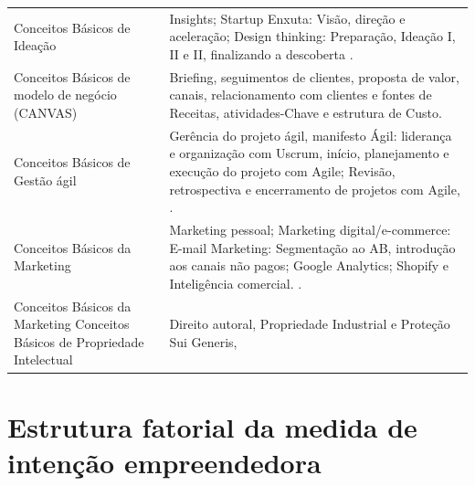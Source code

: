 \begin{apendicesenv}
\begin{longtable}{p{3.5cm}p{11.0cm}}
\endlastfoot

Conceitos Básicos de Ideação & Insights; Startup Enxuta: Visão, direção e aceleração; Design thinking: Preparação, Ideação I, II e II, finalizando a descoberta \cite{alt_design_2018}. \\

Conceitos Básicos de modelo de negócio (CANVAS) & Briefing, seguimentos de clientes, proposta de valor, canais, relacionamento com clientes e fontes de Receitas, atividades-Chave e estrutura de Custo. \cite{finocchio_junior_project_2013} \\

Conceitos Básicos de Gestão ágil & Gerência do projeto ágil, manifesto Ágil: liderança e organização com Uscrum, início, planejamento e execução do projeto com Agile; Revisão, retrospectiva e encerramento de projetos com Agile, \cite{abrahamsson_agile_2017}. \\ 

Conceitos Básicos da Marketing & Marketing pessoal; Marketing digital/e-commerce: E-mail Marketing: Segmentação ao AB, introdução aos canais não pagos; Google Analytics; Shopify e Inteligência comercial. \cite{ritossa_marketing_2009, rizzo_marketing_2017}. \\ 

Conceitos Básicos da Marketing
Conceitos Básicos de Propriedade Intelectual
 & Direito autoral, Propriedade Industrial e Proteção Sui Generis, \cite{wipo_guide_2019} \\ 

\end{longtable}




%


\chapter{Estrutura fatorial da medida de intenção empreendedora}
\label{chap:tabela_3}


\end{apendicesenv}
